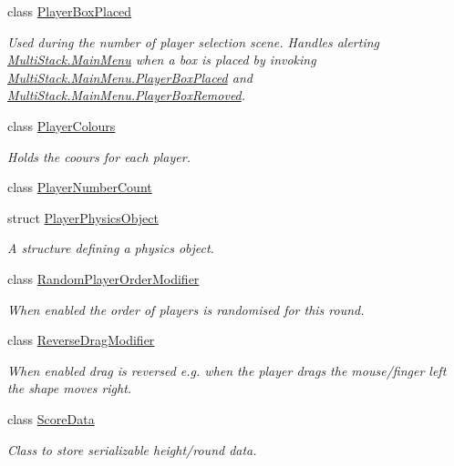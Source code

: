 \begin{DoxyCompactItemize}
class \hyperlink{class_multi_stack_1_1_player_box_placed}{Player\+Box\+Placed}
\begin{DoxyCompactList}\small\item\em Used during the number of player selection scene. Handles alerting \hyperlink{class_multi_stack_1_1_main_menu}{Multi\+Stack.\+Main\+Menu} when a box is placed by invoking \hyperlink{class_multi_stack_1_1_main_menu_ae2fe990ea5367c5613591dbd23ecf9d8}{Multi\+Stack.\+Main\+Menu.\+Player\+Box\+Placed} and \hyperlink{class_multi_stack_1_1_main_menu_a1e974e00f83bacb1d410a9ea6ec73e32}{Multi\+Stack.\+Main\+Menu.\+Player\+Box\+Removed}. \end{DoxyCompactList}\item 
class \hyperlink{class_multi_stack_1_1_player_colours}{Player\+Colours}
\begin{DoxyCompactList}\small\item\em Holds the coours for each player. \end{DoxyCompactList}\item 
class \hyperlink{class_multi_stack_1_1_player_number_count}{Player\+Number\+Count}
\item 
struct \hyperlink{struct_multi_stack_1_1_player_physics_object}{Player\+Physics\+Object}
\begin{DoxyCompactList}\small\item\em A structure defining a physics object. \end{DoxyCompactList}\item 
class \hyperlink{class_multi_stack_1_1_random_player_order_modifier}{Random\+Player\+Order\+Modifier}
\begin{DoxyCompactList}\small\item\em When enabled the order of players is randomised for this round. \end{DoxyCompactList}\item 
class \hyperlink{class_multi_stack_1_1_reverse_drag_modifier}{Reverse\+Drag\+Modifier}
\begin{DoxyCompactList}\small\item\em When enabled drag is reversed e.\+g. when the player drags the mouse/finger left the shape moves right. \end{DoxyCompactList}\item 
class \hyperlink{class_multi_stack_1_1_score_data}{Score\+Data}
\begin{DoxyCompactList}\small\item\em Class to store serializable height/round data. \end{DoxyCompactList}\item 

\end{DoxyCompactItemize}
